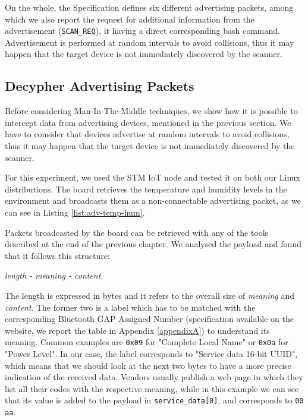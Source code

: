 On the whole, the Specification defines six different advertising packets, among which we also report the request for additional information from the advertisement (\texttt{SCAN\_REQ}), it having a direct corresponding bash command. Advertisement is performed at random intervals to avoid collisions, thus it may happen that the target device is not immediately discovered by the scanner.

\iffalse
\subsection{Decypher Advertising Packets}
Before considering Man-In-The-Middle techniques, we show how it is possible to intercept data from advertising devices, mentioned in the previous section. We have to consider that devices advertise at random intervals to avoid collisions, thus it may happen that the target device is not immediately discovered by the scanner.

For this experiment, we used the STM IoT node and tested it on both our Linux distributions. The board retrieves the temperature and humidity levels in the environment and broadcasts them as a non-connectable advertising packet, as we can see in Listing \ref{list:adv-temp-hum}.


Packets broadcasted by the board can be retrieved with any of the tools described at the end of the previous chapter. We analysed the payload and found that it follows this structure:
\begin{center}
	\textit{length - meaning - content}.
\end{center}
The length is expressed in bytes and it refers to the overall size of \textit{meaning} and \textit{content}. The former two is a label which has to be matched with the corresponding Bluetooth GAP Assigned Number (specification available on the website, we report the table in Appendix \ref{appendixA}) to understand its meaning. Common examples are \texttt{0x09} for "Complete Local Name" or \texttt{0x0a} for "Power Level". In our case, the label corresponds to "Service data 16-bit UUID", which means that we should look at the next two bytes to have a more precise indication of the received data. Vendors usually publish a web page in which they list all their codes with the respective meaning, while in this example we can see that its value is added to the payload in \texttt{service\_data[0]}, and corresponds to \texttt{00 aa}.

